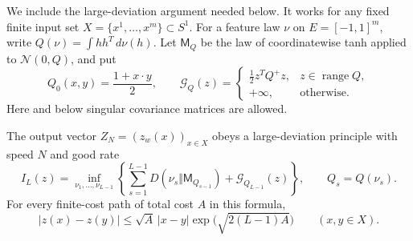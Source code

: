 We include the large-deviation argument needed below. It works for any
fixed finite input set $X=\{x^1,\ldots,x^m\}\subset S^1$. For a feature
law $\nu$ on $E=[-1,1]^m$, write
$Q(\nu)=\int hh^T\,d\nu(h)$. Let $\mathsf M_Q$ be the law of
coordinatewise tanh applied to $\mathcal N(0,Q)$, and put
\[
 Q_0(x,y)=\frac{1+x\cdot y}{2},\qquad
 \mathcal G_Q(z)=
 \begin{cases}\frac12z^TQ^+z,&z\in\operatorname{range}Q,\\
 +\infty,&\text{otherwise}.
 \end{cases}
\]
Here and below singular covariance matrices are allowed.

\begin{lemma}
\label{lem:critical-finite-ldp-depth}
The output vector $Z_N=(z_w(x))_{x\in X}$ obeys a large-deviation
principle with speed $N$ and good rate
\[
 I_L(z)=\inf_{\nu_1,\ldots,\nu_{L-1}}
 \left\{\sum_{s=1}^{L-1}D(\nu_s\Vert\mathsf M_{Q_{s-1}})
                   +\mathcal G_{Q_{L-1}}(z)\right\},
 \qquad Q_s=Q(\nu_s).
\]
For every finite-cost path of total cost $A$ in this formula,
\begin{equation}\label{eq:critical-metric-bound-depth}
 |z(x)-z(y)|\le\sqrt A\,|x-y|
                         \exp\!\bigl(\sqrt{2(L-1)A}\bigr)
 \qquad(x,y\in X).
\end{equation}
\end{lemma}

